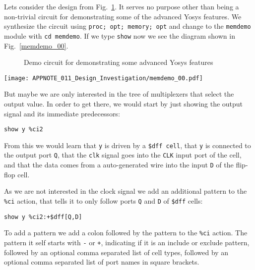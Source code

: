 \documentclass[9pt,technote,a4paper]{IEEEtran}
\begin{document}
Lets consider the design from Fig.~\ref{memdemo_src}. It serves no purpose other than being a non-trivial
circuit for demonstrating some of the advanced Yosys features. We synthesize the circuit using {\tt proc;
opt; memory; opt} and change to the {\tt memdemo} module with {\tt cd memdemo}. If we type {\tt show}
now we see the diagram shown in Fig.~\ref{memdemo_00}.

\begin{figure}[b!]

\caption{Demo circuit for demonstrating some advanced Yosys features}
\label{memdemo_src}
\end{figure}

\begin{figure*}[t]
\texttt{[image: APPNOTE\_011\_Design\_Investigation/memdemo\_00.pdf]} \\
\caption{Complete circuit diagram for the design shown in Fig.~\ref{memdemo_src}}
\label{memdemo_00}
\end{figure*}

But maybe we are only interested in the tree of multiplexers that select the
output value. In order to get there, we would start by just showing the output signal
and its immediate predecessors:

\begin{verbatim}
show y %ci2
\end{verbatim}

From this we would learn that {\tt y} is driven by a {\tt \$dff cell}, that
{\tt y} is connected to the output port {\tt Q}, that the {\tt clk} signal goes
into the {\tt CLK} input port of the cell, and that the data comes from a
auto-generated wire into the input {\tt D} of the flip-flop cell.

As we are not interested in the clock signal we add an additional pattern to the {\tt \%ci}
action, that tells it to only follow ports {\tt Q} and {\tt D} of {\tt \$dff} cells:

\begin{verbatim}
show y %ci2:+$dff[Q,D]
\end{verbatim}

To add a pattern we add a colon followed by the pattern to the {\tt \%ci}
action. The pattern it self starts with {\tt -} or {\tt +}, indicating if it is
an include or exclude pattern, followed by an optional comma separated list
of cell types, followed by an optional comma separated list of port names in
square brackets.
\end{document}
